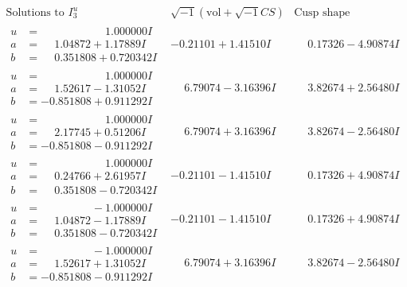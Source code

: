 \documentclass[1p]{elsarticle_modified}
\theoremstyle{definition}
\newcommand{\I}{\sqrt{-1}}
\begin{document}
$$\begin{array}{c|c|c}  
\text{Solutions to }I^u_{3}& \I (\text{vol} + \sqrt{-1}CS) & \text{Cusp shape}\\
 \hline 
\begin{aligned}
u &= \phantom{-0.000000 -}1.000000 I \\
a &= \phantom{-}1.04872 + 1.17889 I \\
b &= \phantom{-}0.351808 + 0.720342 I\end{aligned}
 & -0.21101 + 1.41510 I & \phantom{-}0.17326 - 4.90874 I \\ \hline\begin{aligned}
u &= \phantom{-0.000000 -}1.000000 I \\
a &= \phantom{-}1.52617 - 1.31052 I \\
b &= -0.851808 + 0.911292 I\end{aligned}
 & \phantom{-}6.79074 - 3.16396 I & \phantom{-}3.82674 + 2.56480 I \\ \hline\begin{aligned}
u &= \phantom{-0.000000 -}1.000000 I \\
a &= \phantom{-}2.17745 + 0.51206 I \\
b &= -0.851808 - 0.911292 I\end{aligned}
 & \phantom{-}6.79074 + 3.16396 I & \phantom{-}3.82674 - 2.56480 I \\ \hline\begin{aligned}
u &= \phantom{-0.000000 -}1.000000 I \\
a &= \phantom{-}0.24766 + 2.61957 I \\
b &= \phantom{-}0.351808 - 0.720342 I\end{aligned}
 & -0.21101 - 1.41510 I & \phantom{-}0.17326 + 4.90874 I \\ \hline\begin{aligned}
u &= \phantom{-0.000000 } -1.000000 I \\
a &= \phantom{-}1.04872 - 1.17889 I \\
b &= \phantom{-}0.351808 - 0.720342 I\end{aligned}
 & -0.21101 - 1.41510 I & \phantom{-}0.17326 + 4.90874 I \\ \hline\begin{aligned}
u &= \phantom{-0.000000 } -1.000000 I \\
a &= \phantom{-}1.52617 + 1.31052 I \\
b &= -0.851808 - 0.911292 I\end{aligned}
 & \phantom{-}6.79074 + 3.16396 I & \phantom{-}3.82674 - 2.56480 I \\ \hline\begin{aligned}

\end{aligned}
\end{array}$$
\end{document}
